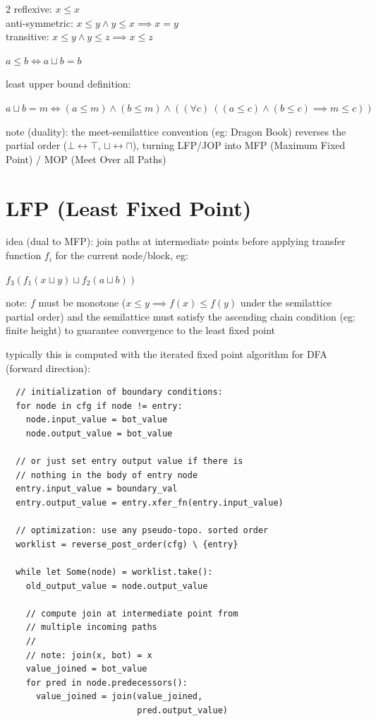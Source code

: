 \documentclass[8pt]{extarticle}
\begin{document}
\begin{multicols*}{2}
  reflexive: $x \leq x$\\
  anti-symmetric: $x \leq y \wedge y \leq x \implies x = y$\\
  transitive: $x \leq y \wedge y \leq z \implies x \leq z$

  $a \leq b \iff a \sqcup b = b$

  least upper bound definition:

  $a \sqcup b = m \iff (a \leq m) \wedge (b \leq m) \wedge ((\forall c)\ ((a \leq c) \wedge (b \leq c) \implies m \leq c))$

  note (duality): the meet-semilattice convention (eg: Dragon Book) reverses the partial order ($\bot \leftrightarrow \top$, $\sqcup \leftrightarrow \sqcap$), turning LFP/JOP into MFP (Maximum Fixed Point) / MOP (Meet Over all Paths)

  \vfill\null
  \columnbreak
    
  \section{LFP (Least Fixed Point)}

  idea (dual to MFP): join paths at intermediate points before applying transfer function $f_i$ for the current node/block, eg:
  
  $f_3(f_1(x \sqcup y) \sqcup f_2(a \sqcup b))$

  note: $f$ must be monotone ($x \leq y \implies f(x) \leq f(y)$ under the semilattice partial order) and the semilattice must satisfy the ascending chain condition (eg: finite height) to guarantee convergence to the least fixed point

  typically this is computed with the iterated fixed point algorithm for DFA (forward direction):

  \begin{verbatim}
  // initialization of boundary conditions:
  for node in cfg if node != entry:
    node.input_value = bot_value
    node.output_value = bot_value

  // or just set entry output value if there is
  // nothing in the body of entry node
  entry.input_value = boundary_val
  entry.output_value = entry.xfer_fn(entry.input_value)

  // optimization: use any pseudo-topo. sorted order
  worklist = reverse_post_order(cfg) \ {entry}

  while let Some(node) = worklist.take():
    old_output_value = node.output_value

    // compute join at intermediate point from
    // multiple incoming paths
    //
    // note: join(x, bot) = x
    value_joined = bot_value
    for pred in node.predecessors():
      value_joined = join(value_joined,
                          pred.output_value)


\end{verbatim}
\end{multicols*}
\end{document}
